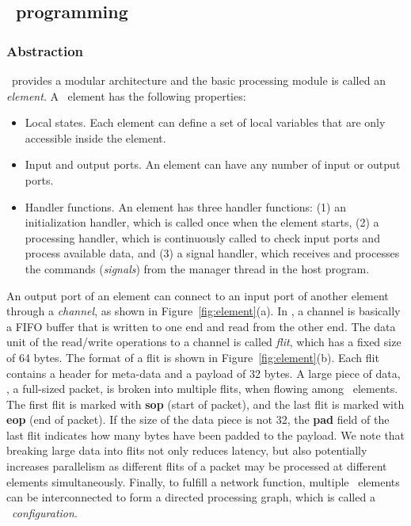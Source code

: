 \subsection{\name\ programming}

\subsubsection{Abstraction}

\name\ provides a modular architecture and the basic processing module is called an \textit{element}.
A \name\ element has the following properties: 
\begin{itemize}
\item Local states. Each element can define a set of local variables that are only accessible inside the element. 
\item Input and output ports. An element can have any number of input or output ports. 
\item Handler functions. An element has three handler functions: (1) an initialization handler, which is called once when the
element starts, (2) a processing handler, which is continuously called to check input ports and process available data,
and (3) a signal handler, which receives and processes the commands (\textit{signals}) from the manager thread in the host program.
\end{itemize}

An output port of an element can connect to an input port of another element through a \textit{channel}, as shown in Figure~\ref{fig:element}(a).
In \name, a channel is basically a FIFO buffer that is written to one end and read from the other end.
The data unit of the read/write operations to a channel is called \textit{flit}, which has a fixed size of 64 bytes.
The format of a flit is shown in Figure~\ref{fig:element}(b). Each flit contains a header for meta-data and a payload of 32 bytes.
A large piece of data, \eg, a full-sized packet, is broken into multiple flits, when flowing among \name\ elements.
The first flit is marked with \textbf{sop} (start of packet), and the last flit is marked with \textbf{eop} (end of packet). 
If the size of the data piece is not 32, the \textbf{pad} field of the last flit indicates how many bytes have been padded to the payload. 
We note that breaking large data into flits not only reduces latency, but also potentially increases parallelism as
different flits of a packet may be processed at different elements simultaneously.
%
Finally, to fulfill a network function, multiple \name\ elements can be interconnected to form a directed processing graph, which 
is called a \name\ \textit{configuration}. 

